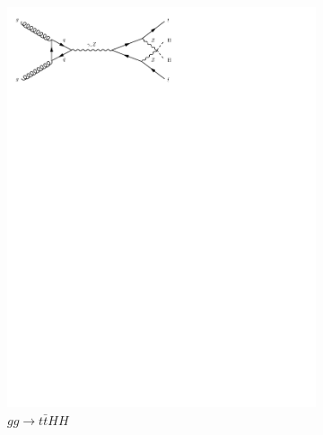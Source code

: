 \begin{figure}[h]
\begin{subfigure}[b]{0.3\textwidth}
    \includegraphics[trim={0.5cm 22cm 10cm 0cm},width=\textwidth]{../Diagrams/D14.pdf}
    \caption{$gg\rightarrow t\bar{t}HH$}
    \label{fey:14}
  \end{subfigure}%
  ~
  \begin{subfigure}[b]{0.3\textwidth}

\end{subfigure}
\end{figure}
